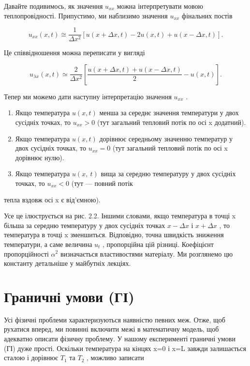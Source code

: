 \documentclass[
  ukrainian,
]{article}
\begin{document}
Давайте подивимось, як значення \(u_{xx}\) можна інтерпретувати мовою
теплопровідності. Припустимо, ми наблизимо значення \(u_{xx}\) фінальних
постів

\[
u_{xx}(x, t) \cong \frac{1}{\Delta x^2} [u(x + \Delta x, t) - 2u(x, t) + u(x - \Delta x, t)].
\]

Це співвідношення можна переписати у вигляді

\[
u_{\lambda x}(x, t) \simeq \frac{2}{\Delta x^2} \left[ \frac{u(x + \Delta x, t) + u(x - \Delta x, t)}{2} - u(x, t) \right].
\]

Тепер ми можемо дати наступну інтерпретацію значення \(u_{xx}\) .

\begin{enumerate}
\def\labelenumi{\arabic{enumi}.}
\item
  Якщо температура \(u(x, t)\) менша за середнє значення температури у
  двох сусідніх точках, то \(u_{xx} > 0\) (тут загальний тепловий потік
  по осі x додатний).
\item
  Якщо температура \(u(x, t)\) дорівнює середньому значенню температур у
  двох сусідніх точках, то \(u_{xx} = 0\) (тут загальний тепловий потік
  по осі x дорівнює нулю).
\item
  Якщо температура \(u\left(x,\ t\right)\) вища за середню температуру у
  двох сусідніх точках, то \(u_{xx}<0\) (тут --- повний потік
\end{enumerate}

тепла вздовж осі x є від'ємною).

Усе це ілюструється на рис. 2.2. Іншими словами, якщо температура в
точці x більша за середню температуру у двох сусідніх точках
\(x - \Delta x\) і \(x + \Delta x\) , то температура в точці x
зменшиться. Відповідно, точна швидкість зниження температури, а саме
величина \(u_t\) , пропорційна цій різниці. Коефіцієнт пропорційності
\(\alpha^2\) визначається властивостями матеріалу. Ми розглянемо цю
константу детальніше у майбутніх лекціях.

\section{Граничні умови
(ГІ)}\label{ux433ux440ux430ux43dux438ux447ux43dux456-ux443ux43cux43eux432ux438-ux433ux456}

Усі фізичні проблеми характеризуються наявністю певних меж. Отже, щоб
рухатися вперед, ми повинні включити межі в математичну модель, щоб
адекватно описати фізичну проблему. У нашому експерименті граничні умови
(ГІ) дуже прості. Оскільки температура на кінцях x=0 і x=L завжди
залишається сталою і дорівнює \(T_1\) та \(T_2\) , можливо записати
\end{document}
